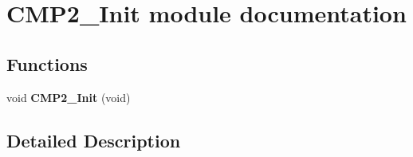 \hypertarget{group___c_m_p2___init__module}{}\section{C\+M\+P2\+\_\+\+Init module documentation}
\label{group___c_m_p2___init__module}
\subsection*{Functions}
\begin{DoxyCompactItemize}
\item 
void {\bfseries C\+M\+P2\+\_\+\+Init} (void)\hypertarget{group___c_m_p2___init__module_gacd538501ae113b7e4b9d1cccc7aa423d}{}\label{group___c_m_p2___init__module_gacd538501ae113b7e4b9d1cccc7aa423d}

\end{DoxyCompactItemize}


\subsection{Detailed Description}
